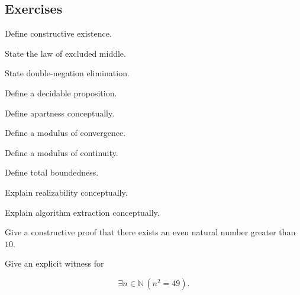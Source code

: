 \subsection{Exercises}
\label{subsec:constructive-mathematics-exercises}

\begin{exercise}[1]
Define constructive existence.
\end{exercise}

\begin{exercise}[1]
State the law of excluded middle.
\end{exercise}

\begin{exercise}[1]
State double-negation elimination.
\end{exercise}

\begin{exercise}[1]
Define a decidable proposition.
\end{exercise}

\begin{exercise}[1]
Define apartness conceptually.
\end{exercise}

\begin{exercise}[1]
Define a modulus of convergence.
\end{exercise}

\begin{exercise}[1]
Define a modulus of continuity.
\end{exercise}

\begin{exercise}[1]
Define total boundedness.
\end{exercise}

\begin{exercise}[1]
Explain realizability conceptually.
\end{exercise}

\begin{exercise}[1]
Explain algorithm extraction conceptually.
\end{exercise}

\begin{exercise}[2]
Give a constructive proof that there exists an even natural number greater
than \(10\).
\end{exercise}

\begin{exercise}[2]
Give an explicit witness for

\[
\exists n\in\mathbb{N}
\,
(n^2=49).
\]
\end{exercise}

